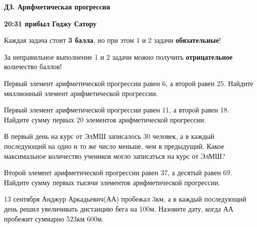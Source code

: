 \centerline{\bf \Huge ДЗ. Арифметическая прогрессия}
\centerline{\bf \Huge }

\begin{flushright}
        \scriptsize{\textbf{20:31 прибыл Годжу Сатору}}
\end{flushright}

Каждая задача стоит \textbf{3 балла}, но при этом 1 и 2 задачи \textbf{обязательные}! 

За неправильное выполнение 1 и 2 задачи можно получить \textbf{отрицательное} количество баллов!

 Первый элемент арифметической прогрессии равен 6, а второй равен 25. Найдите миллионный элемент арифметической прогрессии.

 Первый элемент арифметической прогрессии равен 11, а второй равен 18. Найдите сумму первых 20 элементов арифметической прогрессии.

 В первый день на курс от ЭлМШ записалось 30 человек, а в каждый последующий на одно и то же число меньше, чем в предыдущий. Какое максимальное количество учеников могло записаться на курс от ЭлМШ?

 Второй элемент арифметической прогрессии равен 37, а десятый равен 69. Найдите сумму первых тысячи элементов арифметической прогрессии.

 13 сентября Анджур Аркадьевич(АА) пробежал 3км, а в каждый последующий день решил увеличивать дистанцию бега на 100м. Назовите дату, когда АА пробежит суммарно 523км 600м.